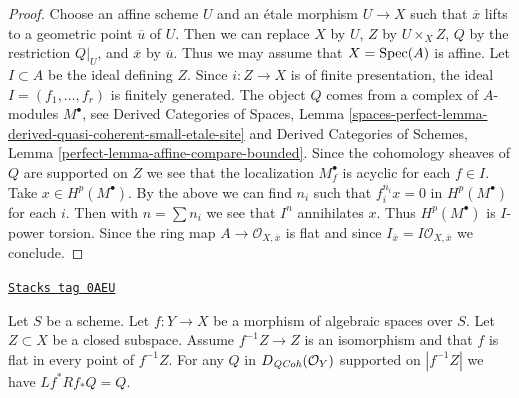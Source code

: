 \begin{proof}
Choose an affine scheme $U$ and an \'etale morphism $U \to X$ such
that $\overline{x}$ lifts to a geometric point $\overline{u}$
of $U$. Then we can replace $X$ by $U$, $Z$ by $U \times_X Z$,
$Q$ by the restriction $Q|_U$, and $\overline{x}$ by $\overline{u}$.
Thus we may assume that $X = \operatorname{Spec}(A)$ is affine. Let $I \subset A$
be the ideal defining $Z$. Since $i : Z \to X$ is of finite presentation,
the ideal $I = (f_1, \ldots, f_r)$ is finitely generated.
The object $Q$ comes from a complex of $A$-modules $M^\bullet$, see
Derived Categories of Spaces, Lemma
\ref{spaces-perfect-lemma-derived-quasi-coherent-small-etale-site}
and
Derived Categories of Schemes, Lemma
\ref{perfect-lemma-affine-compare-bounded}.
Since the cohomology sheaves of $Q$ are supported on $Z$
we see that the localization $M^\bullet_f$ is acyclic for each $f \in I$.
Take $x \in H^p(M^\bullet)$. By the above we can find $n_i$ such
that $f_i^{n_i} x = 0$ in $H^p(M^\bullet)$ for each $i$.
Then with $n = \sum n_i$ we see that $I^n$ annihilates $x$.
Thus $H^p(M^\bullet)$ is $I$-power torsion. Since the ring
map $A \to \mathcal{O}_{X, \overline{x}}$ is flat and since
$I_{\overline{x}} = I\mathcal{O}_{X, \overline{x}}$ we conclude.
\end{proof}

\begin{lemma}
\label{spaces-pushouts-lemma-formal-glueing-on-closed}
\href{https://stacks.math.columbia.edu/tag/0AEU}{\texttt{Stacks tag 0AEU}}

Let $S$ be a scheme. Let $f : Y \to X$ be a morphism of algebraic spaces
over $S$. Let $Z \subset X$ be a closed subspace. Assume $f^{-1}Z \to Z$
is an isomorphism and that $f$ is flat in every point of $f^{-1}Z$. For any
$Q$ in $D_{\mathit{QCoh}}(\mathcal{O}_Y)$ supported on $|f^{-1}Z|$ we have
$Lf^*Rf_*Q = Q$.
\end{lemma}

